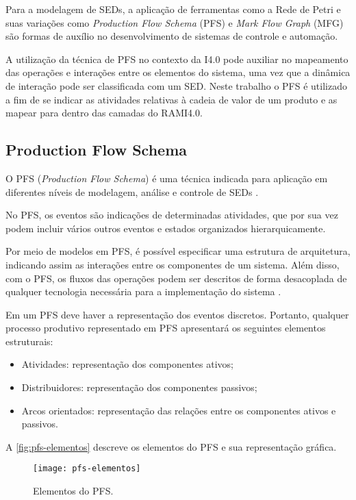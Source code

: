 Para a modelagem de SEDs, a aplicação de ferramentas como a Rede de Petri e suas variações como \textit{Production Flow Schema} (PFS) e \textit{Mark Flow Graph} (MFG) são formas de auxílio no desenvolvimento de sistemas de controle e automação.

A utilização da técnica de PFS no contexto da I4.0 pode auxiliar no mapeamento das operações e interações entre os elementos do sistema, uma vez que a dinâmica de interação pode ser classificada com um SED. Neste trabalho o PFS é utilizado a fim de se indicar as atividades relativas à cadeia de valor de um produto e as mapear para dentro das camadas do RAMI4.0.

\subsection{Production Flow Schema}

O PFS (\textit{Production Flow Schema}) é uma técnica indicada para aplicação em diferentes níveis de modelagem, análise e controle de SEDs \cite{miyagi1996controle}.

No PFS, os eventos são indicações de determinadas atividades, que por sua vez podem incluir vários outros eventos e estados organizados hierarquicamente.

Por meio de modelos em PFS, é possível especificar uma estrutura de arquitetura, indicando assim as interações entre os componentes de um sistema. Além disso, com o PFS, os fluxos das operações podem ser descritos de forma desacoplada de qualquer tecnologia necessária para a implementação do sistema \cite{pisching2018equipmentrami}.

Em um PFS deve haver a representação dos eventos discretos. Portanto, qualquer processo produtivo representado em PFS apresentará os seguintes elementos estruturais:

\begin{itemize}
	\item Atividades: representação dos componentes ativos;
	\item Distribuidores: representação dos componentes passivos;
	\item Arcos orientados: representação das relações entre os componentes ativos  e passivos.
\end{itemize}

A \autoref{fig:pfs-elementos} descreve os elementos do PFS e sua representação gráfica.

\begin{figure}[htb]
	\centering
	\texttt{[image: pfs-elementos]}
	\caption{Elementos do PFS.}
	\label{fig:pfs-elementos}
\end{figure}

